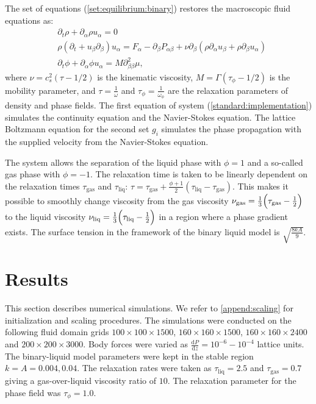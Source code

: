 \documentclass[preprint,12pt]{elsarticle}
\begin{document}
The set of equations (\ref{set:equilibrium:binary}) restores the macroscopic
fluid equations as:
\begin{equation}
\label{full:navier:stokes}
\begin{aligned}
&\partial_t \rho+ \partial_{\alpha} \rho u_{\alpha}=0\\
&\rho\left(\partial_t+u_{\beta}\partial_{\beta}\right) u_{\alpha}=F_{\alpha}
-\partial_{\beta}P_{\alpha \beta} +
\nu\partial_{\beta}\left(\rho\partial_{\alpha}u_{\beta}+\rho\partial_{\beta} u_{\alpha}\right)\\
&\partial_t \phi + \partial_{\alpha} \phi u_{\alpha}=M \partial^2_{\beta\beta} \mu,
\end{aligned}
\end{equation}
where $\nu=c_s^2 (\tau-1/2)$ is the kinematic viscosity,
$M=\Gamma(\tau_{\phi}-1/2)$ is the mobility parameter, and $\tau=\frac{1}{\omega}$ and
$\tau_{\phi}=\frac{1}{\omega_{\phi}}$
are the relaxation parameters of density and phase fields. The first equation of system
(\ref{standard:implementation}) simulates the continuity equation and the Navier-Stokes equation.
The lattice Boltzmann equation for the second set $g_i$ simulates the phase propagation with the
supplied velocity from the Navier-Stokes equation.

The system allows the separation of the liquid
phase with $\phi=1$ and a so-called gas phase with $\phi=-1$. The
relaxation time is taken to be linearly dependent on the relaxation
times $\tau_{\mathrm{gas}}$ and $\tau_{\mathrm{liq}}$:
$\tau=\tau_{\mathrm{gas}}+\frac{\phi+1}{2}(\tau_{\mathrm{liq}}-\tau_{\mathrm{gas}})$. This
makes it possible to smoothly change viscosity from the gas viscosity
$\nu_{\mathrm{gas}}=\frac{1}{3}\Bigl(\tau_{\mathrm{gas}}-\frac{1}{2}\Bigr)$ to the liquid viscosity
$\nu_{\mathrm{liq}}=\frac{1}{3}\Bigl(\tau_{\mathrm{liq}}-\frac{1}{2}\Bigr)$ in a region where a
phase gradient exists. The surface tension in the framework of the binary liquid model is $\sqrt{\frac{8 k
A}{9}}$.

\section{Results}
\label{sec:results}
This section describes numerical simulations. We refer to \ref{append:scaling} for
initialization and scaling procedures. The simulations were conducted on the following 
fluid domain grids $100 \times 100 \times 1500$, $160 \times 160 \times 1500$,
$160 \times 160 \times 2400$ and $200 \times 200 \times 3000$. Body forces were varied as
$\frac{\mathrm{d}P}{\mathrm{d}z}=10^{-6}-10^{-4}$ lattice units. The binary-liquid model parameters
were kept in
the stable region $k=A=0.004,0.04$. The relaxation rates were taken as $\tau_{\mathrm{liq}}=2.5$
and $\tau_{\mathrm{gas}}=0.7$ giving a gas-over-liquid viscosity ratio of $10$. The relaxation
parameter for the phase field was $\tau_{\phi}=1.0$.
\end{document}
